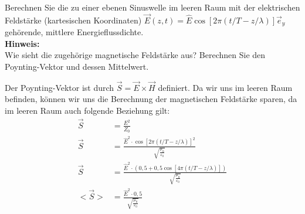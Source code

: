 \begin{question}[section=5,subsection=52,name={Energieflussdichte},difficulty=3,type=bsp,mode=skp,tags={20161207}]
	Berechnen Sie die zu einer ebenen Sinuswelle im leeren Raum mit der elektrischen Feldstärke (kartesischen Koordinaten) $\vec E(z,t) = \hat E \cos[2 \pi (t/T -z/\lambda)] \vec e_y$ gehörende, mittlere Energieflussdichte.
	\\ \textbf{Hinweis:}\\
	Wie sieht die zugehörige magnetische Feldstärke aus? Berechnen Sie den Poynting-Vektor und dessen Mittelwert.
\end{question}
\begin{solution}
	Der Poynting-Vektor ist durch $\vec S = \vec E \times \vec H$ definiert. Da wir uns im leeren Raum befinden, können wir uns die Berechnung der magnetischen Feldstärke sparen, da im leeren Raum auch folgende Beziehung gilt:
	\begin{align}
		\vec S &= \frac{E^2}{Z_0}\\
		\vec S &= \frac{\hat E ^2 \cdot \cos[ 2 \pi (t/T - z/\lambda)]^2}{\sqrt{\frac{\mu_0}{\varepsilon_0}}}\\
		\vec S &= \frac{\hat E ^2 \cdot (0,5 +  0,5 \cos[ 4 \pi (t/T - z/\lambda)])}{\sqrt{\frac{\mu_0}{\varepsilon_0}}}\\
		<\vec S> &= \frac{\hat E ^2 \cdot 0,5}{\sqrt{\frac{\mu_0}{\varepsilon_0}}}
	\end{align}
\end{solution}